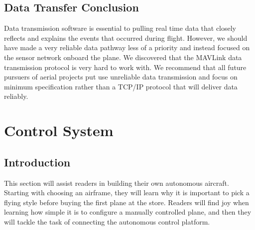 \documentclass[12pt,journal,compsoc]{IEEEtran}
\begin{document}
\subsection{Data Transfer Conclusion}
Data transmission software is essential to pulling real time data that closely reflects and explains the events that occurred during flight. However, we should have made a very reliable data pathway less of a priority and instead focused on the sensor network onboard the plane. We discovered that the MAVLink data transmission protocol is very hard to work with. We recommend that all future pursuers of aerial projects put use unreliable data transmission and focus on minimum specification rather than a TCP/IP protocol that will deliver data reliably. 

\section{Control System}
\subsection{Introduction}
This section will assist readers in building their own autonomous aircraft. Starting with choosing an airframe, they will learn why it is important to pick a flying style before buying the first plane at the store. Readers will find joy when learning how simple it is to configure a manually controlled plane, and then they will tackle the task of connecting the autonomous control platform.
\end{document}
